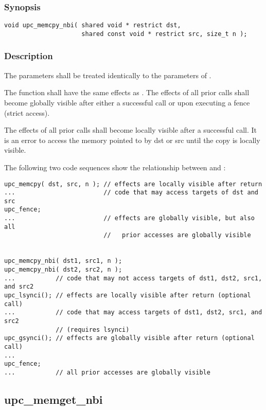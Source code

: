 \subsubsection{Synopsis}

\begin{verbatim}
void upc_memcpy_nbi( shared void * restrict dst,
                     shared const void * restrict src, size_t n );
\end{verbatim}

\subsubsection{Description}

\npf The parameters shall be treated identically to the parameters of
\memcpy{}.

\np The \function{} function shall have the same effects as \memcpy{}.
The effects of all prior \function{} calls shall become globally visible after
either a successful \gsynci{} call or upon executing a fence (strict access).

\np The effects of all prior \function{} calls shall become locally
visible after a successful \lsynci{} call.  It is an error to access the memory
pointed to by dst or src until the copy is locally visible.

\np The following two code sequences show the relationship between
\memcpy{} and \function{}:

\begin{verbatim}
upc_memcpy( dst, src, n ); // effects are locally visible after return
...                        // code that may access targets of dst and src
upc_fence;                 
...                        // effects are globally visible, but also all
                           //   prior accesses are globally visible


upc_memcpy_nbi( dst1, src1, n );
upc_memcpy_nbi( dst2, src2, n );
...           // code that may not access targets of dst1, dst2, src1, and src2
upc_lsynci(); // effects are locally visible after return (optional call)
...           // code that may access targets of dst1, dst2, src1, and src2
              // (requires lsynci)
upc_gsynci(); // effects are globally visible after return (optional call)
...
upc_fence;
...           // all prior accesses are globally visible
\end{verbatim}

\newpage
\subsection{upc\_memget\_nbi}
\def\function{{\tt upc\_memget\_nbi}}

